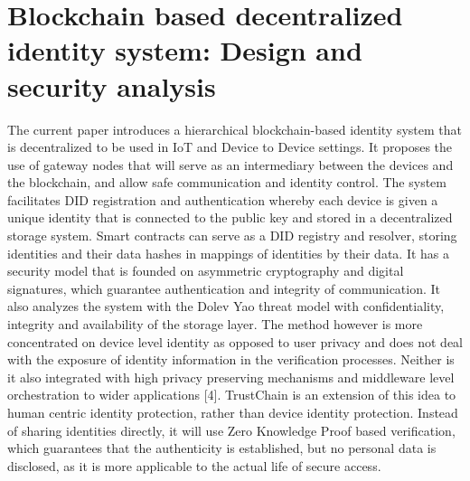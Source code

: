 \section{Blockchain based decentralized identity system: Design and security analysis}
\endgroup
The current paper introduces a hierarchical blockchain-based identity system that is decentralized to be used in IoT and Device to Device settings. It proposes the use of gateway nodes that will serve as an intermediary between the devices and the blockchain, and allow safe communication and identity control. The system facilitates DID registration and authentication whereby each device is given a unique identity that is connected to the public key and stored in a decentralized storage system. Smart contracts can serve as a DID registry and resolver, storing identities and their data hashes in mappings of identities by their data. It has a security model that is founded on asymmetric cryptography and digital signatures, which guarantee authentication and integrity of communication. It also analyzes the system with the Dolev Yao threat model with confidentiality, integrity and availability of the storage layer. The method however is more concentrated on device level identity as opposed to user privacy and does not deal with the exposure of identity information in the verification processes. Neither is it also integrated with high privacy preserving mechanisms and middleware level orchestration to wider applications [4]. TrustChain is an extension of this idea to human centric identity protection, rather than device identity protection. Instead of sharing identities directly, it will use Zero Knowledge Proof based verification, which guarantees that the authenticity is established, but no personal data is disclosed, as it is more applicable to the actual life of secure access.\\

\begingroup
\linespread{0.8}\selectfont
